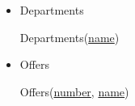 \documentclass[12pt]{article}
\begin{document}
\begin{enumerate}[1.]
\begin{enumerate}[a)]
\begin{itemize}
            \item Departments

            \bigskip

            Departments(\underline{name})

            \bigskip

            \item Offers

            \bigskip

            Offers(\underline{number}, \underline{name})

            \bigskip
        \end{itemize}
    \end{enumerate}



\end{enumerate}
\end{document}
